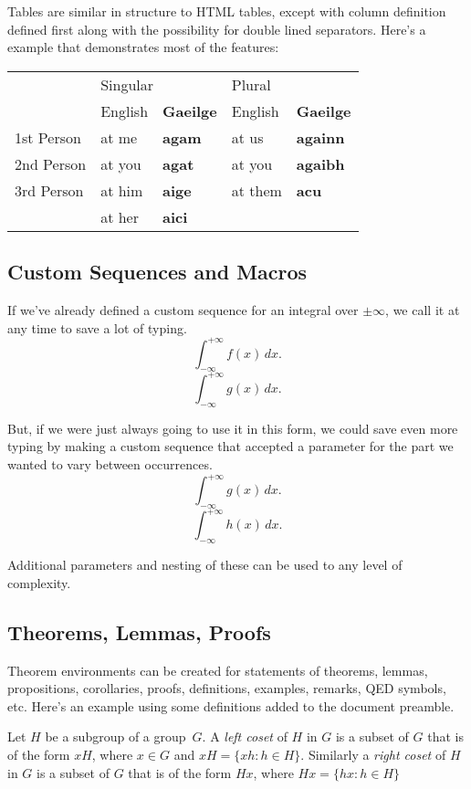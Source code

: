 \documentclass[a4paper,12pt]{article}
\newcommand{\inftyint}{\int_{-\infty}^{+\infty}}
\newcommand{\intwrtx}[1]{\int_{-\infty}^{+\infty} #1 \,dx}
\newenvironment{definition}[1][Definition]{\begin{trivlist}
\item[\hskip \labelsep {\bfseries #1}]}{\end{trivlist}}
\begin{document}
Tables are similar in structure to HTML tables, except with column definition
defined first along with the possibility for double lined separators.  Here's a
example that demonstrates most of the features:

\vspace{10pt}
\begin{tabular}{|l||l|l||l|l|}
\hline
 &\multicolumn{2}{l|}{Singular}&\multicolumn{2}{l|}{Plural}\\
\cline{2-5}
 &English&\textbf{Gaeilge}&English&\textbf{Gaeilge}\\
\hline\hline
1st Person&at me&\textbf{agam}&at us&\textbf{againn}\\
2nd Person&at you&\textbf{agat}&at you&\textbf{agaibh}\\
3rd Person&at him&\textbf{aige}&at them&\textbf{acu}\\
 &at her&\textbf{aici}& & \\
\hline
\end{tabular}

\subsection{Custom Sequences and Macros}

If we've already defined a custom sequence for an integral over $\pm \infty$,
we call it at any time to save a lot of typing.
\[ \inftyint f(x)\,dx. \]
\[ \inftyint g(x)\,dx. \]

But, if we were just always going to use it in this form, we could save even
more typing by making a custom sequence that accepted a parameter for the part
we wanted to vary between occurrences.
\[ \intwrtx{g(x)}. \]
\[ \intwrtx{h(x)}. \]

Additional parameters and nesting of these can be used to any level of
complexity.

\subsection{Theorems, Lemmas, Proofs}

Theorem environments can be created for statements of theorems, lemmas,
propositions, corollaries, proofs, definitions, examples, remarks, QED symbols,
etc.  Here's an example using some definitions added to the document preamble.

\begin{definition}
  Let $H$ be a subgroup of a group~$G$.  A \emph{left coset} of $H$ in $G$ is a
  subset of $G$ that is of the form $xH$, where $x \in G$ and $xH = \{ xh : h
  \in H \}$.  Similarly a \emph{right coset} of $H$ in $G$ is a subset of $G$
  that is of the form $Hx$, where $Hx = \{ hx : h \in H \}$
\end{definition}
\end{document}
